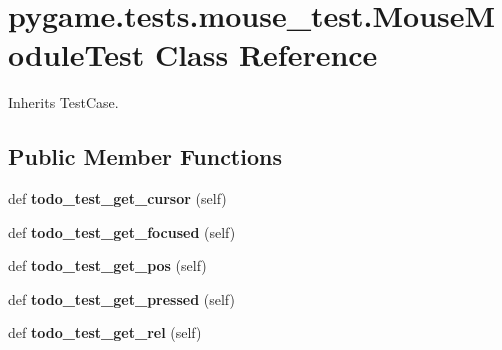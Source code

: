 \hypertarget{classpygame_1_1tests_1_1mouse__test_1_1_mouse_module_test}{}\section{pygame.\+tests.\+mouse\+\_\+test.\+Mouse\+Module\+Test Class Reference}
\label{classpygame_1_1tests_1_1mouse__test_1_1_mouse_module_test}


Inherits Test\+Case.

\subsection*{Public Member Functions}
\begin{DoxyCompactItemize}
\item 
\mbox{\label{classpygame_1_1tests_1_1mouse__test_1_1_mouse_module_test_a67b546f339b5526e0f6abac4752d853d}} 
def {\bfseries todo\+\_\+test\+\_\+get\+\_\+cursor} (self)
\item 
\mbox{\label{classpygame_1_1tests_1_1mouse__test_1_1_mouse_module_test_a7b4559a3383d113bab8e1ae3f031ec55}} 
def {\bfseries todo\+\_\+test\+\_\+get\+\_\+focused} (self)
\item 
\mbox{\label{classpygame_1_1tests_1_1mouse__test_1_1_mouse_module_test_a611b2b36e34c510608e950c165b49056}} 
def {\bfseries todo\+\_\+test\+\_\+get\+\_\+pos} (self)
\item 
\mbox{\label{classpygame_1_1tests_1_1mouse__test_1_1_mouse_module_test_a469747d6b0d39fa25bce3b8dee7e052a}} 
def {\bfseries todo\+\_\+test\+\_\+get\+\_\+pressed} (self)
\item 
\mbox{\label{classpygame_1_1tests_1_1mouse__test_1_1_mouse_module_test_ad4803f35906108dbeaad50876a2d7f28}} 
def {\bfseries todo\+\_\+test\+\_\+get\+\_\+rel} (self)
\item 
\mbox{\label{classpygame_1_1tests_1_1mouse__test_1_1_mouse_module_test_a91465bad6ae3bb1692f2ea0270ddd6b9}} 

\end{DoxyCompactItemize}

